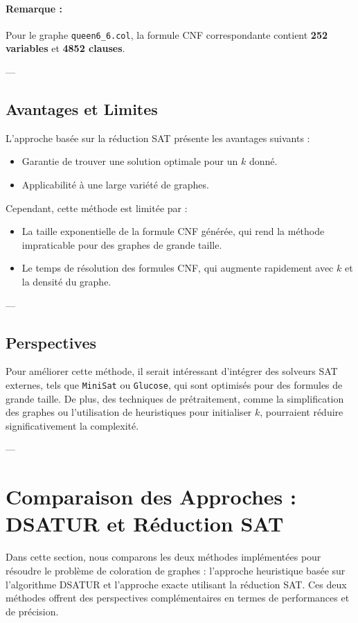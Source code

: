 \documentclass[11pt]{article}
\begin{document}
\paragraph{Remarque :} Pour le graphe \texttt{queen6\_6.col}, la formule CNF correspondante contient \textbf{252 variables} et \textbf{4852 clauses}.

---

\subsection{Avantages et Limites}

L'approche basée sur la réduction SAT présente les avantages suivants :
\begin{itemize}
    \item Garantie de trouver une solution optimale pour un \(k\) donné.
    \item Applicabilité à une large variété de graphes.
\end{itemize}

Cependant, cette méthode est limitée par :
\begin{itemize}
    \item La taille exponentielle de la formule CNF générée, qui rend la méthode impraticable pour des graphes de grande taille.
    \item Le temps de résolution des formules CNF, qui augmente rapidement avec \(k\) et la densité du graphe.
\end{itemize}
---
\subsection{Perspectives}

Pour améliorer cette méthode, il serait intéressant d'intégrer des solveurs SAT externes, tels que \texttt{MiniSat} ou \texttt{Glucose}, qui sont optimisés pour des formules de grande taille. De plus, des techniques de prétraitement, comme la simplification des graphes ou l'utilisation de heuristiques pour initialiser \(k\), pourraient réduire significativement la complexité.

---
\section{Comparaison des Approches : DSATUR et Réduction SAT}

Dans cette section, nous comparons les deux méthodes implémentées pour résoudre le problème de coloration de graphes : l'approche heuristique basée sur l'algorithme DSATUR et l'approche exacte utilisant la réduction SAT. Ces deux méthodes offrent des perspectives complémentaires en termes de performances et de précision.
\end{document}
